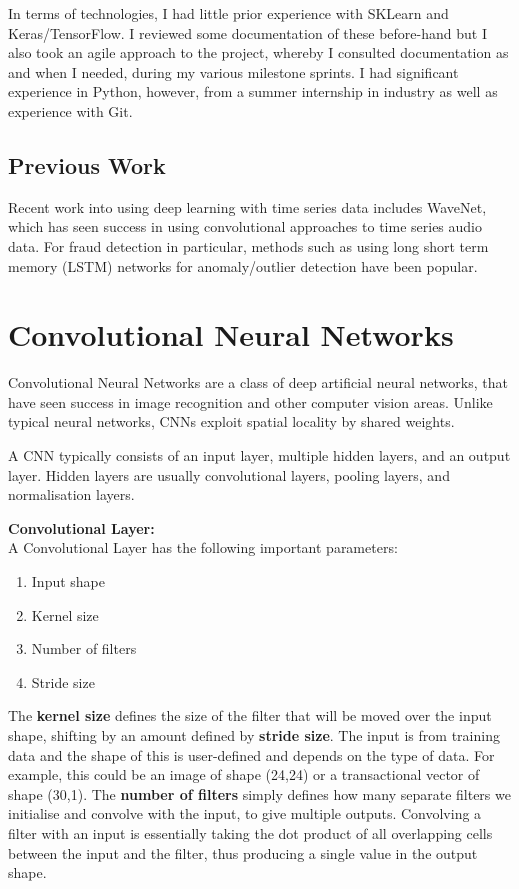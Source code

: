 \documentclass[12pt,a4paper,twoside]{report}
\begin{document}
In terms of technologies, I had little prior experience with SKLearn and Keras/TensorFlow. I reviewed some documentation of these before-hand but I also took an agile approach to the project, whereby I consulted documentation as and when I needed, during my various milestone sprints. I had significant experience in Python, however, from a summer internship in industry as well as experience with Git.

\subsection{Previous Work}
 Recent work into using deep learning with time series data includes WaveNet\cite{DBLP:journals/corr/OordDZSVGKSK16}, which has seen success in using convolutional approaches to time series audio data. For fraud detection in particular, methods such as using long short term memory (LSTM)\cite{Hochreiter:1997:LSM:1246443.1246450} networks for anomaly/outlier detection\cite{malhotra2015long} have been popular.


\section{Convolutional Neural Networks}
Convolutional Neural Networks\cite{DBLP:journals/corr/SimonyanZ14a} are a class of deep artificial neural networks, that have seen success in image recognition and other computer vision areas. Unlike typical neural networks, CNNs exploit spatial locality by shared weights. 

A CNN typically consists of an input layer, multiple hidden layers, and an output layer. Hidden layers are usually convolutional layers, pooling layers, and normalisation layers. 

\textbf{Convolutional Layer:}\\
A Convolutional Layer has the following important parameters: 
\begin{enumerate}
  \item Input shape
  \item Kernel size
  \item Number of filters
  \item Stride size
\end{enumerate}

The \textbf{kernel size} defines the size of the filter that will be moved over the input shape, shifting by an amount defined by \textbf{stride size}. The input is from training data and the shape of this is user-defined and depends on the type of data. For example, this could be an image of shape (24,24) or a transactional vector of shape (30,1). The \textbf{number of filters} simply defines how many separate filters we initialise and convolve with the input, to give multiple outputs. Convolving a filter with an input is essentially taking the dot product of all overlapping cells between the input and the filter, thus producing a single value in the output shape. 
\end{document}
